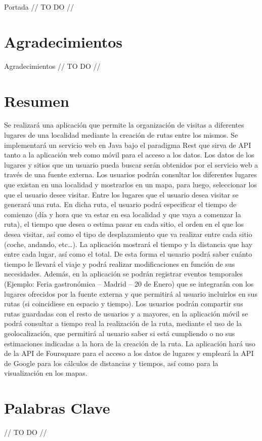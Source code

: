 \documentclass[a4paper,12pt,twoside]{book}
\begin{document}
\pagestyle{empty}
Portada
// TO DO //
\newpage
\chapter*{Agradecimientos}
Agradecimientos
// TO DO //
\newpage
\chapter*{Resumen}
Se realizará una aplicación que permite la organización de visitas a diferentes lugares de
una localidad mediante la creación de rutas entre los mismos. Se implementará un
servicio web en Java bajo el paradigma Rest que sirva de API tanto a la aplicación web
como móvil para el acceso a los datos. Los datos de los lugares y sitios que un usuario
pueda buscar serán obtenidos por el servicio web a través de una fuente externa. Los
usuarios podrán consultar los diferentes lugares que existan en una localidad y
mostrarlos en un mapa, para luego, seleccionar los que el usuario desee visitar. Entre
los lugares que el usuario desea visitar se generará una ruta. En dicha ruta, el usuario
podrá especificar el tiempo de comienzo (día y hora que va estar en esa localidad y que
vaya a comenzar la ruta), el tiempo que desea o estima pasar en cada sitio, el orden en
el que los desea visitar, así como el tipo de desplazamiento que va realizar entre cada
sitio (coche, andando, etc…). La aplicación mostrará el tiempo y la distancia que hay
entre cada lugar, así como el total. De esta forma el usuario podrá saber cuánto tiempo
le llevará el viaje y podrá realizar modificaciones en función de sus necesidades.
Además, en la aplicación se podrán registrar eventos temporales (Ejemplo: Feria
gastronómica – Madrid – 20 de Enero) que se integrarán con los lugares ofrecidos por la
fuente externa y que permitirá al usuario incluirlos en sus rutas (si coincidiese en espacio
y tiempo). Los usuarios podrán compartir sus rutas guardadas con el resto de usuarios y
a mayores, en la aplicación móvil se podrá consultar a tiempo real la realización de la
ruta, mediante el uso de la geolocalización, que permitirá al usuario saber si está
cumpliendo o no sus estimaciones indicadas a la hora de la creación de la ruta.
La aplicación hará uso de la API de Foursquare para el acceso a los datos de lugares y
empleará la API de Google para los cálculos de distancias y tiempos, así como para la
visualización en los
mapas. 
\newpage
\chapter*{Palabras Clave}
// TO DO //
\newpage
\end{document}
